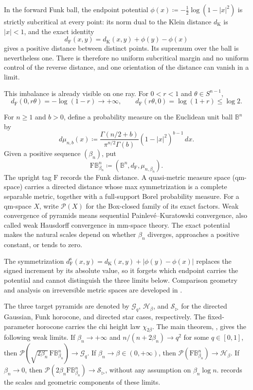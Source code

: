 \documentclass{amsart}
\numberwithin{equation}{section}
\theoremstyle{plain}
\theoremstyle{definition}
\theoremstyle{remark}
\newcommand{\B}{\mathbb B}
\newcommand{\BetaBall}{\mathrm F\mathbb B^n_{\beta_n}}
\newcommand{\Pyr}{\mathcal P}
\newcommand{\dF}{d_{\mathrm F}}
\newcommand{\dK}{d_{\mathrm K}}
\begin{document}
In the forward Funk ball, the endpoint potential $\phi(x)\coloneqq-\frac12\log(1-|x|^2)$ is strictly subcritical at every point: its norm dual to the Klein distance $\dK$ is $|x|<1$, and the exact identity
\[ \dF(x,y)=\dK(x,y)+\phi(y)-\phi(x) \]
gives a positive distance between distinct points.  Its supremum over the ball is nevertheless one.  There is therefore no uniform subcritical margin and no uniform control of the reverse distance, and one orientation of the distance can vanish in a limit.

This imbalance is already visible on one ray.  For $0<r<1$ and $\theta\in S^{n-1}$,
\begin{equation}\label{eq:origin-distances} \dF(0,r\theta)=-\log(1-r)\longrightarrow+\infty,\qquad \dF(r\theta,0)=\log(1+r)\le\log2. \end{equation}

For $n\ge1$ and $b>0$, define a probability measure on the Euclidean unit ball $\B^n$ by
\begin{equation}\label{eq:beta-measure} d\mu_{n,b}(x) \coloneqq\frac{\Gamma(n/2+b)}{\pi^{n/2}\Gamma(b)}(1-|x|^2)^{b-1}\,dx. \end{equation}
Given a positive sequence $(\beta_n)$, put
\[ \BetaBall\coloneqq(\B^n,\dF,\mu_{n,\beta_n}). \]
The upright tag $\mathrm F$ records the Funk distance.
A quasi-metric measure space (qm-space) carries a directed distance whose max symmetrization is a complete separable metric, together with a full-support Borel probability measure.  For a qm-space $X$, write $\Pyr(X)$ for the Box-closed family of its exact factors.  Weak convergence of pyramids means sequential Painlev\'e--Kuratowski convergence, also called weak Hausdorff convergence in mm-space theory.  The exact potential makes the natural scales depend on whether $\beta_n$ diverges, approaches a positive constant, or tends to zero.

The symmetrization $\dF^{\mathrm s}(x,y)=\dK(x,y)+|\phi(y)-\phi(x)|$ replaces the signed increment by its absolute value, so it forgets which endpoint carries the potential and cannot distinguish the three limits below.  Comparison geometry and analysis on irreversible metric spaces are developed in \cite{ohta2021comparison,kristaly-zhao2022geometry,kristaly-ohta-zhao2025analysis}.

The three target pyramids are denoted by $\mathcal G_q$, $\mathcal H_\beta$, and $\mathcal S_{\rhd}$ for the directed Gaussian, Funk horocone, and directed star cases, respectively.  The fixed-parameter horocone carries the chi height law $\chi_{2\beta}$.  The main theorem, , gives the following weak limits.  If $\beta_n\to+\infty$ and $n/(n+2\beta_n)\to q^2$ for some $q\in[0,1]$, then $\Pyr(\sqrt{2\beta_n}\,\BetaBall)\to\mathcal G_q$.  If $\beta_n\to\beta\in(0,+\infty)$, then $\Pyr(\BetaBall)\to\mathcal H_\beta$.  If $\beta_n\to0$, then $\Pyr(2\beta_n\BetaBall)\to\mathcal S_{\rhd}$, without any assumption on $\beta_n\log n$.   records the scales and geometric components of these limits.
\end{document}
